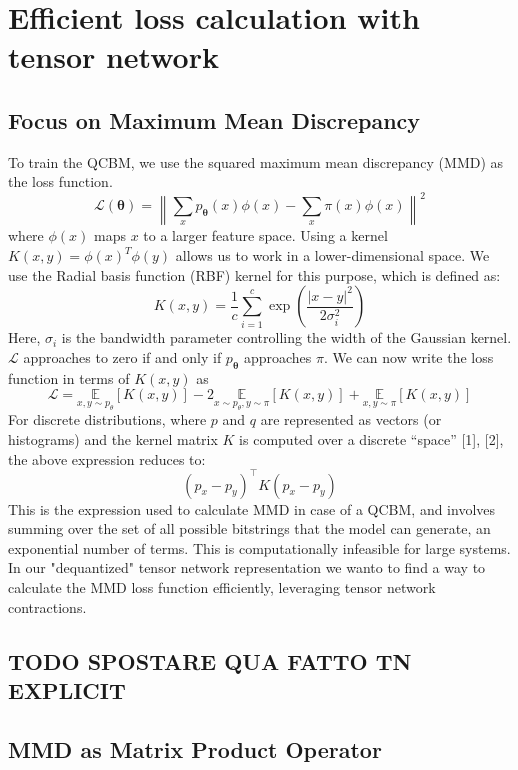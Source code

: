 \section[Efficient loss calculation with tensor network]{Efficient loss calculation with tensor network}

\subsection{Focus on Maximum Mean Discrepancy}

To train the QCBM, we use the squared maximum mean discrepancy (MMD) as the loss function.
\[ 
\mathcal{L}(\boldsymbol{\theta})=\left\|\sum_x p_{\boldsymbol{\theta}}(x) \phi(x)-\sum_x \pi(x) \phi(x)\right\|^2 
\]
where $\phi(x)$ maps $x$ to a larger feature space. Using a kernel $K(x, y)=\phi(x)^T \phi(y)$ allows us to work in a lower-dimensional space. We use the Radial basis function (RBF) kernel for this purpose, which is defined as:
$$
K(x, y)=\frac{1}{c} \sum_{i=1}^c \exp \left(\frac{|x-y|^2}{2 \sigma_i^2}\right)
$$
Here, $\sigma_i$ is the bandwidth parameter controlling the width of the Gaussian kernel. $\mathcal{L}$ approaches to zero if and only if $p_{\boldsymbol{\theta}}$ approaches $\pi$.
We can now write the loss function in terms of $K(x, y)$ as
$$ 
\mathcal{L}=\underset{x, y \sim p_\theta}{\mathbb{E}}[K(x, y)]-2 \underset{x \sim p_\theta, y \sim \pi}{\mathbb{E}}[K(x, y)]+\underset{x, y \sim \pi}{\mathbb{E}}[K(x, y)] 
$$
For discrete distributions, where $p$ and $q$ are represented as vectors (or histograms) and the kernel matrix $K$ is computed over a discrete “space” [1], [2], the above expression reduces to:
$$ 
\left(p_x-p_y\right)^{\top} K\left(p_x-p_y\right) 
$$
This is the expression used to calculate MMD in case of a QCBM, and involves summing over the set of all possible bitstrings that the model can generate, an exponential number of terms. This is computationally infeasible for large systems. In our "dequantized" tensor network representation we wanto to find a way to calculate the MMD loss function efficiently, leveraging tensor network contractions.

\subsection{TODO SPOSTARE QUA FATTO TN EXPLICIT}

\subsection{MMD as Matrix Product Operator}


